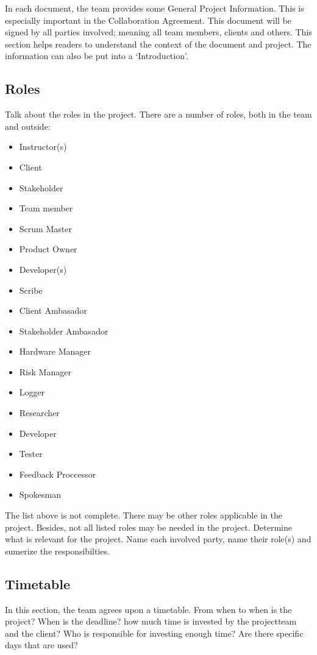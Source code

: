 \documentclass[10pt]{report}
\begin{document}
In each document, the team provides some General Project Information. This is especially important in the Collaboration Agreement. This document will be signed by all parties involved; meaning all team members, clients and others. This section helps readers to understand the context of the document and project. The information can also be put into a `Introduction'.

\subsection{Roles}

Talk about the roles in the project. There are a number of roles, both in the team and outside:

\begin{itemize}
	\item Instructor(s)
	\item Client
	\item Stakeholder
	\item Team member
	\item Scrum Master
	\item Product Owner
	\item Developer(s)
	\item Scribe
	\item Client Ambasador
	\item Stakeholder Ambasador
	\item Hardware Manager
	\item Risk Manager
	\item Logger
	\item Researcher
	\item Developer
	\item Tester
	\item Feedback Proccessor
	\item Spokesman
\end{itemize}


The list above is not complete. There may be other roles applicable in the project. Besides, not all listed roles may be needed in the project. Determine what is relevant for the project. Name each involved party, name their role(s) and sumerize the responsibilties.

\subsection{Timetable}

In this section, the team agrees upon a timetable. From when to when is the project? When is the deadline? how much time is invested by the projectteam and the client? Who is responsible for investing enough time? Are there specific days that are used?
\end{document}
